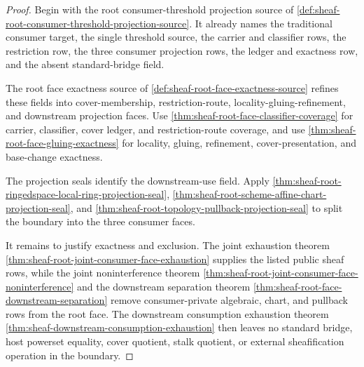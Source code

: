 \begin{proof}
Begin with the root consumer-threshold projection source of \autoref{def:sheaf-root-consumer-threshold-projection-source}. It already names the traditional consumer target, the single threshold source, the carrier and classifier rows, the restriction row, the three consumer projection rows, the ledger and exactness row, and the absent standard-bridge field.

The root face exactness source of \autoref{def:sheaf-root-face-exactness-source} refines these fields into cover-membership, restriction-route, locality-gluing-refinement, and downstream projection faces. Use \autoref{thm:sheaf-root-face-classifier-coverage} for carrier, classifier, cover ledger, and restriction-route coverage, and use \autoref{thm:sheaf-root-face-gluing-exactness} for locality, gluing, refinement, cover-presentation, and base-change exactness.

The projection seals identify the downstream-use field. Apply \autoref{thm:sheaf-root-ringedspace-local-ring-projection-seal}, \autoref{thm:sheaf-root-scheme-affine-chart-projection-seal}, and \autoref{thm:sheaf-root-topology-pullback-projection-seal} to split the boundary into the three consumer faces.

It remains to justify exactness and exclusion. The joint exhaustion theorem \autoref{thm:sheaf-root-joint-consumer-face-exhaustion} supplies the listed public sheaf rows, while the joint noninterference theorem \autoref{thm:sheaf-root-joint-consumer-face-noninterference} and the downstream separation theorem \autoref{thm:sheaf-root-face-downstream-separation} remove consumer-private algebraic, chart, and pullback rows from the root face. The downstream consumption exhaustion theorem \autoref{thm:sheaf-downstream-consumption-exhaustion} then leaves no standard bridge, host powerset equality, cover quotient, stalk quotient, or external sheafification operation in the boundary.
\end{proof}
